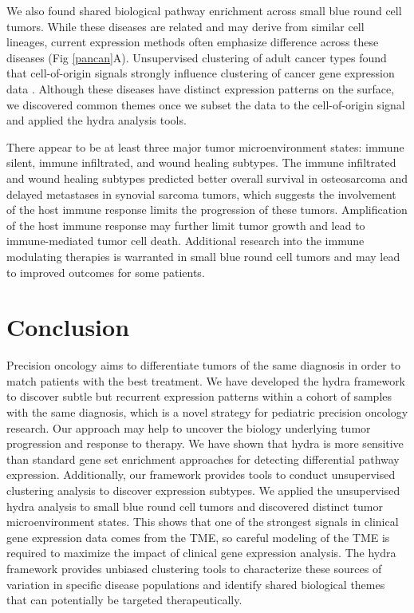 \documentclass[10pt,letterpaper]{article}
\begin{document}
We also found shared biological pathway enrichment across small blue round cell tumors. While these diseases are related and may derive from similar cell lineages, current expression methods often emphasize difference across these diseases (Fig \ref{pancan}A). Unsupervised clustering of adult cancer types found that cell-of-origin signals strongly influence clustering of cancer gene expression data \cite{hoadleyCellofOriginPatternsDominate2018}. Although these diseases have distinct expression patterns on the surface, we discovered common themes once we subset the data to the cell-of-origin signal and applied the hydra analysis tools. 

There appear to be at least three major tumor microenvironment states: immune silent, immune infiltrated, and wound healing subtypes. The immune infiltrated and wound healing subtypes predicted better overall survival in osteosarcoma and delayed metastases in synovial sarcoma tumors, which suggests the involvement of the host immune response limits the progression of these tumors. Amplification of the host immune response may further limit tumor growth and lead to immune-mediated tumor cell death. Additional research into the immune modulating therapies is warranted in small blue round cell tumors and may lead to improved outcomes for some patients.

\section*{Conclusion}
Precision oncology aims to differentiate tumors of the same diagnosis in order to match patients with the best treatment. We have developed the hydra framework to discover subtle but recurrent expression patterns within a cohort of samples with the same diagnosis, which is a novel strategy for pediatric precision oncology research. Our approach may help to uncover the biology underlying tumor progression and response to therapy. We have shown that hydra is more sensitive than standard gene set enrichment approaches for detecting differential pathway expression. Additionally, our framework provides tools to conduct unsupervised clustering analysis to discover expression subtypes. We applied the unsupervised hydra analysis to small blue round cell tumors and discovered distinct tumor microenvironment states. This shows that one of the strongest signals in clinical gene expression data comes from the TME, so careful modeling of the TME is required to maximize the impact of clinical gene expression analysis. The hydra framework provides unbiased clustering tools to characterize these sources of variation in specific disease populations and identify shared biological themes that can potentially be targeted therapeutically.
\end{document}
